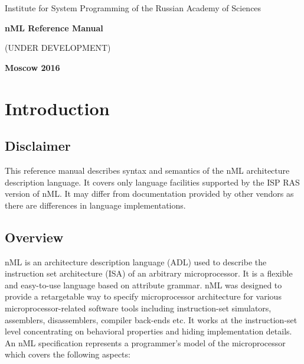 \documentclass[oneside,final,14pt]{extreport}
\begin{document}
\begin{titlepage}
\begin{center}
\Large{Institute for System Programming of the Russian Academy of Sciences}

\vfill


\bf\Large{nML Reference Manual}

(UNDER DEVELOPMENT)

\vfill

\bf
Moscow 2016
\end{center}
\end{titlepage}


\newpage
{} %
\tableofcontents


\chapter{Introduction}


\section{Disclaimer}

This reference manual describes syntax and semantics of the nML architecture
description language. It covers only language facilities supported by the ISP RAS
version of nML. It may differ from documentation provided by other vendors as
there are differences in language implementations.


\section{Overview}

nML is an architecture description language (ADL) used to describe the
instruction set architecture (ISA) of an arbitrary microprocessor. It is a
flexible and easy-to-use language based on attribute grammar. nML was designed
to provide a retargetable way to specify microprocessor architecture for
various microprocessor-related software tools including instruction-set
simulators, assemblers, disassemblers, compiler back-ends etc. It works at
the instruction-set level concentrating on behavioral properties and hiding
implementation details. An nML specification represents a programmer's model
of the microprocessor which covers the following aspects:
\end{document}
